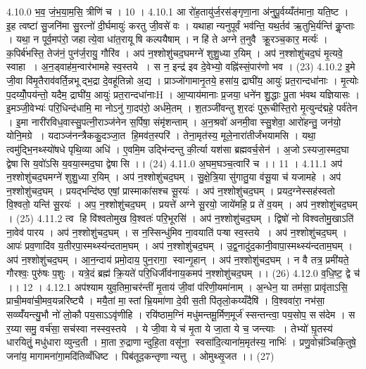 4.10.0
भ॒व॒ जं॒भ॒या॒म॒सि॒ त्रीणि॑ च । 10 ।
4.10.1
आ रो॑ह॒तायु॑र्ज॒रस॑ङ्गृणा॒ना अ॑नुपू॒र्वय्यँत॑माना॒ यति॒ष्ट । इ॒ह त्वष्टा॑ सु॒जनि॑मा सु॒रत्नो॑ दी॒र्घमायुः॑ करतु जी॒वसे॑ वः । यथाहान्यनुपूर्वं भव॑न्ति॒ यथ॒र्तव॑ ऋ॒तुभि॒र्यन्ति॑ कॢ॒प्ताः । यथा॒ न पूर्व॒मप॑रो॒ जहात्ये॒वा धा॑त॒रायू॑षि कल्पयैषाम् । न हि॑ ते अग्ने त॒नुवै क्रू॒रञ्च॒कार॒ मर्त्यः॑ । क॒पिर्ब॑भस्ति॒ तेज॑नं॒ पुन॑र्ज॒रायु॒ गौरि॑व । अप॑ न॒श्शोशु॑चद॒घमग्ने॑ शुशु॒ध्या र॒यिम् । अप॑ न॒श्शोशु॑चद॒घं मृ॒त्यवे॒ स्वाहा । अ॒न॒ड्वाह॑म॒न्वार॑भामहे स्व॒स्तये । स न॒ इन्द्र॑ इव दे॒वेभ्यो॒ वह्नि॑स्सं॒पार॑णो भव । (23)
4.10.2
इ॒मे जी॒वा वि॑मृ॒तैराव॑वर्ति॒न्नभूद्भ॒द्रा दे॒वहू॑तिन्नो अ॒द्य । प्राञ्जो॑गामानृ॒तये॒ हसा॑य॒ द्राघी॑य॒ आयुः॑ प्रत॒रान्दधा॑नाः । मृ॒त्योः प॒दय्योँ॒पय॑न्तो॒ यदैम॒ द्राघी॑य॒ आयुः॑ प्रत॒रान्दधा॑नाःH । आ॒प्याय॑मानाः प्र॒जया॒ धने॑न शु॒द्धाः पू॒ता भ॑वथ यज्ञियासः । इ॒मञ्जी॒वेभ्यः॑ परि॒धिन्द॑धामि॒ मा नोऽनु॑ गा॒दप॑रो॒ अर्ध॑मे॒तम् । श॒तञ्जी॑वन्तु श॒रदः॑ पुरू॒चीस्ति॒रो मृ॒त्युन्द॑द्महे॒ पर्व॑तेन । इ॒मा नारी॑रविध॒वास्सु॒पत्नी॒राञ्ज॑नेन स॒र्पिषा॒ संमृ॑शन्ताम् । अ॒न॒श्रवो॑ अनमी॒वा स्सु॒शेवा॒ आरो॑हन्तु॒ जन॑यो॒ योनि॒मग्रे । यदाञ्ज॑नन्त्रैककु॒दञ्जा॒त हि॒मव॑त॒स्परि॑ । तेना॒मृत॑स्य॒ मूले॒नारा॑तीर्जंभयामसि । यथा॒ त्वमु॑द्भि॒नथ्स्यो॑षधे पृथि॒व्या अधि॑ । ए॒वमि॒म उद्भि॑न्दन्तु की॒र्त्या यश॑सा ब्रह्मवर्च॒सेन॑ । अ॒जोऽस्यजा॒स्मद॒घा द्वेषा॑सि य॒वो॑ऽसि य॒वया॒स्मद॒घा द्वेषा॑सि ।। (24)
4.11.0
अ॒घम॒घञ्च॒त्वारि॑ च ।। 11 ।
4.11.1
अप॑ न॒श्शोशु॑चद॒घमग्ने॑ शुशु॒ध्या र॒यिम् । अप॑ न॒श्शोशु॑चद॒घम् । सु॒क्षे॒त्रि॒या सु॑गातु॒या व॑सू॒या च॑ यजामहे । अप॑ न॒श्शोशु॑चद॒घम् । प्रयद्भन्दि॑ष्ठ एषां॒ प्रास्माका॑सश्च सू॒रयः॑ । अप॑ न॒श्शोशु॑चद॒घम् । प्रयद॒ग्नेस्सह॑स्वतो वि॒श्वतो॒ यन्ति॑ सू॒रयः॑ । अप॒ न॒श्शोशु॑चद॒घम् । प्रयत्ते॑ अग्ने सू॒रयो॒ जाये॑महि॒ प्र ते॑ व॒यम् । अप॑ न॒श्शोशु॑चद॒घम् । (25)
4.11.2
त्व हि वि॑श्वतोमुख वि॒श्वतः॑ परि॒भूरसि॑ । अप॑ न॒श्शोशु॑चद॒घम् । द्विषो॑ नो विश्वतोमु॒खाऽति॑ ना॒वेव॑ पारय । अप॑ न॒श्शोशु॑चद॒घम् । स न॒स्सिन्धु॑मिव ना॒वयाति॑ पऱ्षा स्व॒स्तये । अप॑ न॒श्शोशु॑चद॒घम् । आपः॑ प्रव॒णादि॑व य॒तीरपा॒स्मथ्स्य॑न्दताम॒घम् । अप॑ न॒श्शोशु॑चद॒घम् । उ॒द्व॒नादु॑द॒कानी॒वापा॒स्मथ्स्य॑न्दताम॒घम् । अप॑ न॒श्शोशु॑चद॒घम् । आ॒न॒न्दाय॑ प्रमो॒दाय॒ पुन॒रागा॒॒ स्वान्गृ॒हान् । अप॑ न॒श्शोशु॑चद॒घम् । न वै तत्र॒ प्रमी॑यते॒ गौरश्वः॒ पुरु॑षः प॒शुः । यत्रे॒दं ब्रह्म॑ क्रि॒यते॑ परि॒धिर्जीव॑नाय॒कमप॑ न॒श्शोशु॑चद॒घम् ।। (26)
4.12.0
व॒धि॒ष्ट॒ द्वे च॑ ।। 12 ।
4.12.1
अप॑श्याम युव॒तिमा॒चर॑न्तीं मृ॒ताय॑ जी॒वां प॑रिणी॒यमा॑नाम् । अ॒न्धेन॒ या तम॑सा॒ प्रावृ॑ताऽसि॒ प्राची॒मवा॑ची॒मव॒यन्नरि॑ष्ट्यै । मयै॒तां मा॒॒स्तां भ्रि॒यमा॑णा दे॒वी स॒ती पि॑तृलो॒कय्यँदैषि॑ । वि॒श्ववा॑रा॒ नभ॑सा॒ सव्व्यँ॑यन्त्यु॒भौ नो॑ लो॒कौ पय॒साऽऽवृ॑णीहि । रयि॑ष्ठाम॒ग्निं मधु॑मन्तमू॒र्मिण॒मूर्ज॑ स्सन्तन्त्वा॒ पय॒सोप॒ सस॑देम । स र॒य्या समु॒ वर्च॑सा॒ सच॑स्वा नस्स्व॒स्तये । ये जी॒वा ये च॑ मृ॒ता ये जा॒ता ये च॒ जन्त्याः । तेभ्यो॑ घ़ृ॒तस्य॑ धारयितुं॒ मधु॑धारा व्युन्द॒ती । मा॒ता रु॒द्राणान्दुहि॒ता वसू॑ना॒॒ स्वसा॑दि॒त्याना॑म॒मृत॑स्य॒ नाभिः॑ । प्रणु॒वोच़॑ञ्चिकि॒तुषे॒ जना॑य॒ मागामना॑गा॒मदि॑तिव्वँधिष्ट । पिब॑तूद॒कन्तृणान्यत्तु । ओमुथ्सृ॒जत ।। (27)

